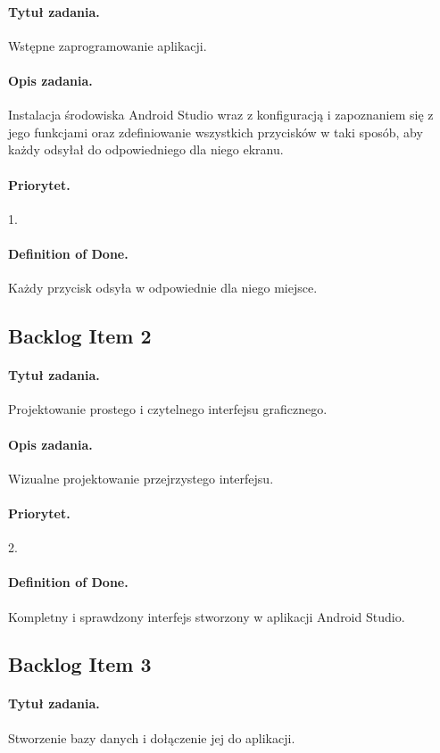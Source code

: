 \documentclass[a4paper]{article}
\begin{document}
\paragraph{Tytuł zadania.} Wstępne zaprogramowanie aplikacji.
\paragraph{Opis zadania.} Instalacja środowiska Android Studio wraz z konfiguracją i zapoznaniem się z jego funkcjami oraz zdefiniowanie wszystkich przycisków w taki sposób, aby każdy odsyłał do odpowiedniego dla niego ekranu.
\paragraph{Priorytet.} 1.
\paragraph{Definition of Done.} Każdy przycisk odsyła w odpowiednie dla niego miejsce.

\subsection{Backlog Item 2}
\paragraph{Tytuł zadania.} Projektowanie prostego i czytelnego interfejsu graficznego.
\paragraph{Opis zadania.} Wizualne projektowanie przejrzystego interfejsu.
\paragraph{Priorytet.} 2.
\paragraph{Definition of Done.} Kompletny i sprawdzony interfejs stworzony w aplikacji Android Studio.

\subsection{Backlog Item 3}
\paragraph{Tytuł zadania.} Stworzenie bazy danych i dołączenie jej do aplikacji.
\end{document}
